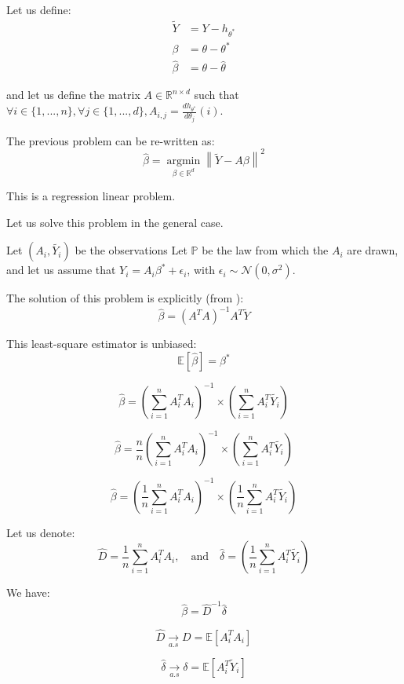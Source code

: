 Let us define:
\begin{align*}
\tilde{Y} &= Y - h_{\theta^*} \\
\beta &= \theta - \theta^* \\
\hat{\beta} &= \theta - \hat{\theta}
\end{align*}

and let us define the matrix $A \in \mathbb{R} ^{n \times d }$ such that $\forall i \in \{ 1, ..., n\}, \forall j \in \{1, ..., d\}, A_{i, j} = \frac{dh_{\theta^*}}{d\theta_j}(i)$.

The previous problem can be re-written as:
\[
\hat{\beta} =  \underset{\beta \in \mathbb{R}^d}{\operatorname{argmin}}  \left\lVert \tilde{Y} - A \beta \right\rVert ^2
\]

This is a regression linear problem.

Let us solve this problem in the general case.

Let $(A_i, \tilde{Y_i})$ be the observations Let $\mathbb{P}$ be the law from which the $A_i$ are drawn, and let us assume that $Y_i = A_i \beta ^* + \epsilon_i $, with $\epsilon_i \sim \mathcal{N}(0, \sigma^2)$.


The solution of this problem is explicitly (from \cite*{powellasymptoticsforleastsquares}):
\[
\hat{\beta } = (A^T A ) ^{-1} A^T \tilde{Y}
\]

This least-square estimator is unbiased:
\[
\mathbb{E}[\hat{\beta}] = \beta^*
\]

\[
\hat {\beta } = \left(  \sum_{i=1}^{n}   A_i ^T A_i \right) ^{-1}    \times \left(  \sum_{i=1}^{n} A_i ^T \tilde{Y_i } \right)
\]

\[
\hat {\beta } =\frac{n}{n} \left(  \sum_{i=1}^{n}   A_i ^T A_i \right) ^{-1}    \times \left(  \sum_{i=1}^{n} A_i ^T \tilde{Y_i } \right)
\]

\[
\hat {\beta } = \left( \frac{1}{n} \sum_{i=1}^{n}   A_i ^T A_i \right) ^{-1}    \times \left( \frac{1}{n} \sum_{i=1}^{n} A_i ^T \tilde{Y_i } \right)
\]

Let us denote:
\[
\hat{D}  = \frac{1}{n} \sum_{i=1}^{n}   A_i ^T A_i , \quad \text{and} \quad \hat{\delta}  = \left( \frac{1}{n} \sum_{i=1}^{n} A_i ^T \tilde{Y_i } \right)
\]

We have:
\[
\hat{\beta} = \hat{D} ^{-1} \hat{\delta}
\]

\[
\hat{D}  \underset{a.s}{\rightarrow} D=  \mathbb{E}[A_i ^T A_i ]
\]

\[
\hat{\delta}   \underset{a.s}{\rightarrow}  \delta = \mathbb{E}[A_i ^T \tilde{Y}_i ]
\]

